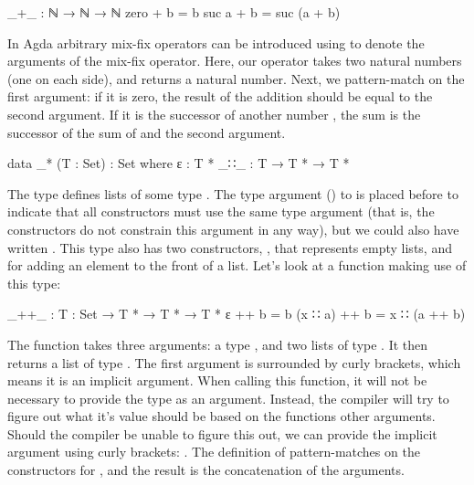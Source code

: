 		\begin{code}
			_+_ : ℕ → ℕ → ℕ
			zero + b = b
			suc a + b = suc (a + b)
		\end{code}

		In Agda arbitrary mix-fix operators can be introduced using \codett{\_}
		to denote the arguments of the mix-fix operator. Here, our operator
		\codett{\_+\_} takes two natural numbers (one on each side), and
		returns a natural number. Next, we pattern-match on the first argument:
		if it is zero, the result of the addition should be equal to the second
		argument. If it is the successor of another number , the sum
		is the successor of the sum of  and the second argument.

		\begin{code}
			data _* (T : Set) : Set where
			  ε : T *
			  _∷_ : T → T * → T *
		\end{code}

		The type \codett{\_*} defines lists of some type . The type
		argument () to \codett{\_*} is placed before \codett{:}
		to indicate that all constructors must use the same type argument (that
		is, the constructors do not constrain this argument in any way), but we
		could also have written . This type
		also has two constructors, , that represents empty lists, and
		 for adding an element to the front of a list. Let's look
		at a function making use of this type:

		\begin{code}
			_++_ : {T : Set} → T * → T * → T *
			ε ++ b = b
			(x ∷ a) ++ b = x ∷ (a ++ b)
		\end{code}

		The function \codett{\_++\_} takes three arguments: a type ,
		and two lists of type . It then returns a list of type
		. The first argument is surrounded by curly brackets, which
		means it is an implicit argument. When calling this function, it will
		not be necessary to provide the type as an argument. Instead, the
		compiler will try to figure out what it's value should be based on the
		functions other arguments. Should the compiler be unable to figure this
		out, we can provide the implicit argument using curly brackets:
		. The definition of \codett{\_++\_}
		pattern-matches on the constructors for , and the result is
		the concatenation of the arguments.

%

